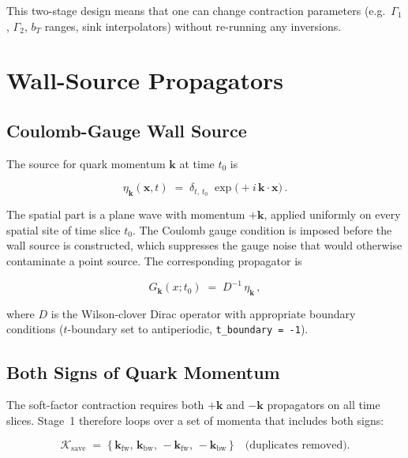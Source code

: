 \documentclass[11pt,a4paper]{article}
\newcommand{\walltag}[1]{\texttt{#1}}
\begin{document}
This two-stage design means that one can change contraction parameters
(e.g.\ $\Gamma_{1}$, $\Gamma_{2}$, $b_{T}$ ranges, sink interpolators) without
re-running any inversions.

\section{Wall-Source Propagators}

\subsection{Coulomb-Gauge Wall Source}

The source for quark momentum $\mathbf{k}$ at time $t_{0}$ is

\begin{equation}\label{eq:wall_src}
\eta_{\mathbf{k}}(\mathbf{x}, t)
   \;=\; \delta_{t,\,t_{0}}\;\exp\!\big( +i\,\mathbf{k}\!\cdot\!\mathbf{x} \big)\, .
\end{equation}

The spatial part is a plane wave with momentum $+\mathbf{k}$, applied uniformly on
every spatial site of time slice $t_{0}$.  The Coulomb gauge condition is imposed
before the wall source is constructed, which suppresses the gauge noise that would
otherwise contaminate a point source.  The corresponding propagator is

\begin{equation}\label{eq:wall_prop}
G_{\mathbf{k}}(x; t_{0}) \;=\; D^{-1}\,\eta_{\mathbf{k}}\, ,
\end{equation}

where $D$ is the Wilson-clover Dirac operator with appropriate boundary conditions
($t$-boundary set to antiperiodic, \walltag{t\_boundary = -1}).

\subsection{Both Signs of Quark Momentum}

The soft-factor contraction requires both $+\mathbf{k}$ and $-\mathbf{k}$
propagators on all time slices.  Stage~1 therefore loops over a set of momenta that
includes both signs:

\begin{equation}
\mathcal{K}_{\text{save}} \;=\;
  \{\,\mathbf{k}_{\mathrm{fw}},\,\mathbf{k}_{\mathrm{bw}},\,
   -\mathbf{k}_{\mathrm{fw}},\,-\mathbf{k}_{\mathrm{bw}}\,\}
\quad\text{(duplicates removed)}.
\end{equation}
\end{document}
